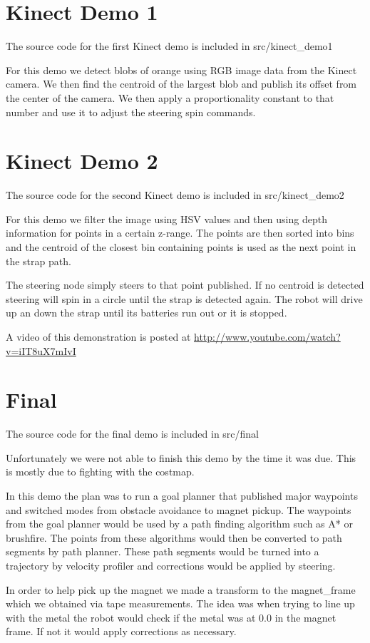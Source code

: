 \section{Kinect Demo 1}
The source code for the first Kinect demo is included in src/kinect\_demo1

For this demo we detect blobs of orange using RGB image data from the Kinect camera. We then find the centroid of the largest blob and publish its offset from the center of the camera. We then apply a proportionality constant to that number and use it to adjust the steering spin commands.

\section{Kinect  Demo 2}
The source code for the second Kinect demo is included in src/kinect\_demo2

For this demo we filter the image using HSV values and then using depth information for points in a certain z-range.  The points are then sorted into bins and the centroid of the closest bin containing points is used as the next point in the strap path.

The steering node simply steers to that point published. If no centroid is detected steering will spin in a circle until the strap is detected again. The robot will drive up an down the strap until its batteries run out or it is stopped.

A video of this demonstration is posted at \url{http://www.youtube.com/watch?v=iIT8uX7mIvI}

\section{Final}
The source code for the final demo is included in src/final

Unfortunately we were not able to finish this demo by the time it was due. This is mostly due to fighting with the costmap.

In this demo the plan was to run a goal planner that published major waypoints and switched modes from obstacle avoidance to magnet pickup.  The waypoints from the goal planner would be used by a path finding algorithm such as A* or brushfire. The points from these algorithms would then be converted to path segments by path planner. These path segments would be turned into a trajectory by velocity profiler and corrections would be applied by steering.

In order to help pick up the magnet we made a transform to the magnet\_frame which we obtained via tape measurements. The idea was when trying to line up with the metal the robot would check if the metal was at 0.0 in the magnet frame. If not it would apply corrections as necessary.
